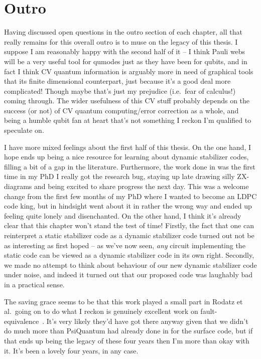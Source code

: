 \chapter{Outro}\label{ch:outro}

Having discussed open questions in the outro section of each chapter, all that really remains for this overall outro is to muse on the legacy of this thesis.
I suppose I am reasonably happy with the second half of it -- I think Pauli webs will be a very useful tool for qumodes just as they have been for qubits, and in fact I think CV quantum information is arguably more in need of graphical tools that its finite dimensional counterpart, just because it's a good deal more complicated!
Though maybe that's just my prejudice (i.e.\ fear of calculus!) coming through.
The wider usefulness of this CV stuff probably depends on the success (or not) of CV quantum computing/error correction as a whole, and being a humble qubit fan at heart that's not something I reckon I'm qualified to speculate on.

I have more mixed feelings about the first half of this thesis.
On the one hand, I hope  ends up being a nice resource for learning about dynamic stabilizer codes, filling a bit of a gap in the literature.
Furthermore, the work done in  was the first time in my PhD I really got the research bug, staying up late drawing silly ZX-diagrams and being excited to share progress the next day.
This was a welcome change from the first few months of my PhD where I wanted to become an LDPC code king, but in hindsight went about it in rather the wrong way and ended up feeling quite lonely and disenchanted.
On the other hand, I think it's already clear that this chapter won't stand the test of time!
Firstly, the fact that one can reinterpret a static stabilizer code as a dynamic stabilizer code turned out not be as interesting as first hoped -- as we've now seen, \textit{any} circuit implementing the static code can be viewed as a dynamic stabilizer code in its own right.
Secondly, we made no attempt to think about behaviour of our new dynamic stabilizer code under noise, and indeed it turned out that our proposed code was laughably bad in a practical sense.

The saving grace seems to be that this work played a small part in Rodatz et al.\ going on to do what I reckon is genuinely excellent work on fault-equivalence~\cite{rodatz2024floquetifying,rodatz2025faulttoleranceconstruction,rüsch2025completenessfaultequivalenceclifford}.
It's very likely they'd have got there anyway given that we didn't do much more than PsiQuantum had already done in  for the surface code, but if that ends up being the legacy of these four years then I'm more than okay with it.
It's been a lovely four years, in any case.

